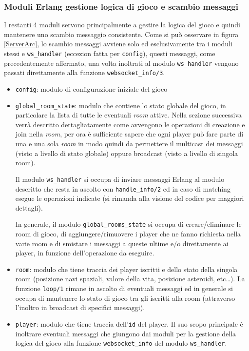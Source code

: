 \documentclass[paper=a4, fontsize=11pt]{scrartcl} %
\numberwithin{equation}{section} %
\numberwithin{figure}{section} %
\numberwithin{table}{section} %
\begin{document}
\subsubsection{Moduli Erlang gestione logica di gioco e scambio messaggi}
I restanti 4 moduli servono principalmente a gestire la logica del gioco e quindi mantenere uno scambio messaggio consistente. Come si può osservare in figura \ref{ServerArc}, lo scambio messaggi avviene solo ed esclusivamente tra i moduli stessi e \texttt{ws\_handler} (eccezion fatta per \texttt{config}), questi messaggi, come precedentemente affermato, una volta inoltrati al modulo \texttt{ws\_handler} vengono passati direttamente alla funzione \texttt{websocket\_info/3}.
\begin{itemize}
\item \texttt{config}: modulo di configurazione iniziale del gioco
\item \texttt{global\_room\_state}: modulo che contiene lo stato globale del gioco, in particolare la lista di tutte le eventuali \textit{room} attive. Nella sezione successiva verrà descritto dettagliatamente come avvengono le operazioni di creazione e join nella \textit{room}, per ora è sufficiente sapere che ogni player può fare parte di una e una sola \textit{room} in modo quindi da permettere il multicast dei messaggi (visto a livello di stato globale) oppure broadcast (visto a livello di singola room).

Il modulo \texttt{ws\_handler} si occupa di inviare messaggi Erlang al modulo descritto che resta in ascolto con \texttt{handle\_info/2} ed in caso di matching esegue le operazioni indicate (si rimanda alla visione del codice per maggiori dettagli).

In generale, il modulo \texttt{global\_rooms\_state} si occupa di creare/eliminare le room di gioco, di aggiungere/rimuovere i player che ne fanno richiesta nella varie room e di smistare i messaggi a queste ultime e/o direttamente ai player, in funzione dell'operazione da eseguire.
\item \texttt{room}: modulo che tiene traccia dei player iscritti e dello stato della singola room (posizione navi spaziali, valore della vita, posizione asteroidi, etc\dots).
La funzione \texttt{loop/1} rimane in ascolto di eventuali messaggi ed in generale si occupa di mantenere lo stato di gioco tra gli iscritti alla room (attraverso l'inoltro in broadcast di specifici messaggi).
\item \texttt{player}: modulo che tiene traccia dell'\texttt{id} del player. Il suo scopo principale è inoltrare eventuali messaggi che giungono dai moduli per la gestione della logica del gioco alla funzione \texttt{websocket\_info} del modulo \texttt{ws\_handler}.
\end{itemize}
\end{document}
